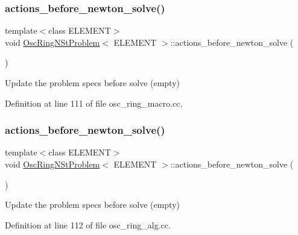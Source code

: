 \subsubsection{\texorpdfstring{actions\+\_\+before\+\_\+newton\+\_\+solve()}{actions\_before\_newton\_solve()}\hspace{0.1cm}{\footnotesize\ttfamily [1/2]}}
{\footnotesize\ttfamily template$<$class E\+L\+E\+M\+E\+NT$>$ \\
void \hyperlink{classOscRingNStProblem}{Osc\+Ring\+N\+St\+Problem}$<$ E\+L\+E\+M\+E\+NT $>$\+::actions\+\_\+before\+\_\+newton\+\_\+solve (\begin{DoxyParamCaption}{ }\end{DoxyParamCaption})\hspace{0.3cm}{\ttfamily [inline]}}



Update the problem specs before solve (empty) 



Definition at line 111 of file osc\+\_\+ring\+\_\+macro.\+cc.

\mbox{\label{classOscRingNStProblem_a7d8ff9543c042752b649ed326d6c5915}} 
\subsubsection{\texorpdfstring{actions\+\_\+before\+\_\+newton\+\_\+solve()}{actions\_before\_newton\_solve()}\hspace{0.1cm}{\footnotesize\ttfamily [2/2]}}
{\footnotesize\ttfamily template$<$class E\+L\+E\+M\+E\+NT$>$ \\
void \hyperlink{classOscRingNStProblem}{Osc\+Ring\+N\+St\+Problem}$<$ E\+L\+E\+M\+E\+NT $>$\+::actions\+\_\+before\+\_\+newton\+\_\+solve (\begin{DoxyParamCaption}{ }\end{DoxyParamCaption})\hspace{0.3cm}{\ttfamily [inline]}}



Update the problem specs before solve (empty) 



Definition at line 112 of file osc\+\_\+ring\+\_\+alg.\+cc.

